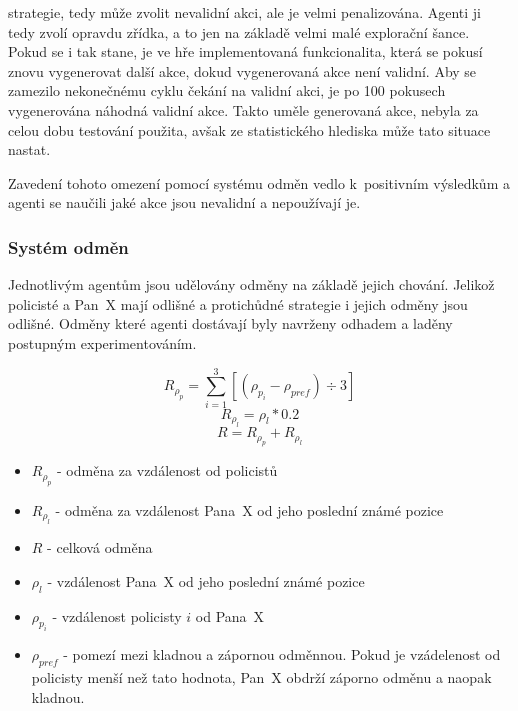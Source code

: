 strategie, tedy může zvolit nevalidní akci, ale je velmi penalizována.
Agenti ji tedy zvolí opravdu zřídka, a to jen na základě velmi malé explorační šance.
Pokud se i tak stane, je ve hře implementovaná funkcionalita, která se pokusí znovu vygenerovat další akce, dokud vygenerovaná akce není validní.
Aby se zamezilo nekonečnému cyklu čekání na validní akci, je po 100 pokusech vygenerována náhodná validní akce.
Takto uměle generovaná akce, nebyla za celou dobu testování použita, avšak ze statistického hlediska může tato situace nastat.

Zavedení tohoto omezení pomocí systému odměn vedlo k~positivním výsledkům a agenti se naučili jaké akce jsou nevalidní a nepoužívají je.

\subsubsection*{Systém odměn}
\label{subsubsec:odmeny}

Jednotlivým agentům jsou udělovány odměny na základě jejich chování.
Jelikož policisté a Pan~X mají odlišné a protichůdné strategie i jejich odměny jsou odlišné.
Odměny které agenti dostávají byly navrženy odhadem a laděny postupným experimentováním.

\begin{equation}
    \label{eq:odmena_za_vzdalenost_od_policisty}
  R_{\rho_p} = \sum_{i=1}^{3}[(\rho_{p_i} - \rho_{pref}) \div 3]
\end{equation}
\begin{equation}
    \label{eq:odmena_za_vzdalenost_od_posledni_pozice}
  R_{\rho_l} = \rho_l * 0.2
\end{equation}
\begin{equation}
    \label{eq:celkova_odmena}
  R = R_{\rho_p} + R_{\rho_l}
\end{equation}

\begin{itemize}
  \item $R_{\rho_p}$ - odměna za vzdálenost od policistů
  \item $R_{\rho_l}$ - odměna za vzdálenost Pana~X od jeho poslední známé pozice
  \item $R$ - celková odměna
  \item $\rho_l$ - vzdálenost Pana~X od jeho poslední známé pozice
  \item $\rho_{p_i}$ - vzdálenost policisty $i$ od Pana~X
  \item $\rho_{pref}$ - pomezí mezi kladnou a zápornou odměnnou.
  Pokud je vzádelenost od policisty menší než tato hodnota, Pan~X obdrží záporno odměnu a naopak kladnou.
\end{itemize}

